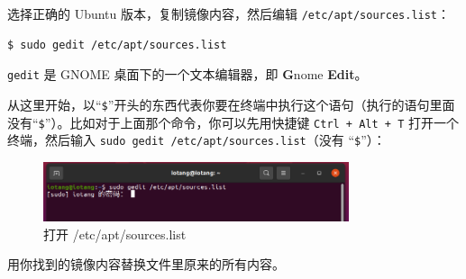 \documentclass[UTF-8]{ctexart}
\begin{document}
				选择正确的 Ubuntu 版本，复制镜像内容，然后编辑 \texttt{/etc/apt/sources.list}：
	
				\begin{verbatim}
$ sudo gedit /etc/apt/sources.list
				\end{verbatim}
			
				\texttt{gedit} 是 GNOME 桌面下的一个文本编辑器，即 \textbf{G}nome \textbf{Edit}。
				
				从这里开始，以“\texttt{\$}”开头的东西代表你要在终端中执行这个语句（执行的语句里面没有“\texttt{\$}”）。比如对于上面那个命令，你可以先用快捷键 \texttt{Ctrl + Alt + T} 打开一个终端，然后输入 \texttt{sudo gedit /etc/apt/sources.list}（没有 “\texttt{\$}”）：
	
				\begin{figure}[H]
					\centering
					\includegraphics[width=0.8\textwidth]{fig/gedit_etcaptsourceslist.png}
					\caption*{打开 /etc/apt/sources.list}
				\end{figure}
				
				用你找到的镜像内容替换文件里原来的所有内容。
				
\end{document}
